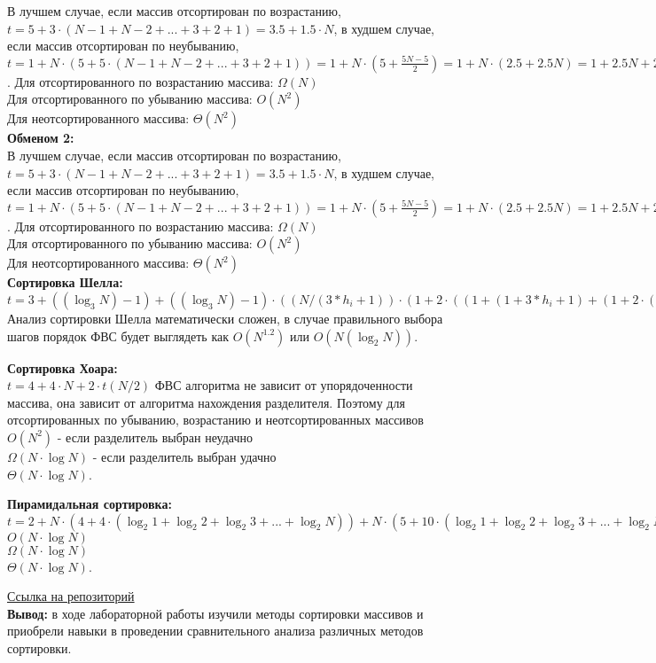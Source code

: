 \documentclass[a4paper,14pt]{extarticle}
\begin{document}
\begin{enumerate}
	      В лучшем случае, если массив отсортирован по возрастанию, $t = 5 + 3 \cdot (N - 1 + N - 2 + ... + 3 + 2 + 1) = 3.5 + 1.5\cdot N$, 
		  в худшем случае, если массив отсортирован по неубыванию, 
		  $t = 1 + N\cdot (5 + 5 \cdot (N - 1 + N - 2 + ... + 3 + 2 + 1)) = 1 + N\cdot(5 + \frac{5N - 5}{2}) = 1 + N \cdot (2.5 + 2.5N) = 1 + 2.5N + 2.5N^2$.\bigbreak
		  Для отсортированного по возрастанию массива: $\Omega(N)$\\
		  Для отсортированного по убыванию массива: $O(N^2)$\\
		  Для неотсортированного массива: $\Theta(N^2)$\\
	      \textbf{Обменом 2:}\\
	      В лучшем случае, если массив отсортирован по возрастанию, $t = 5 + 3\cdot(N - 1 + N - 2 + ... + 3 + 2 + 1) = 3.5 + 1.5\cdot N$, 
		  в худшем случае, если массив отсортирован по неубыванию, 
		  $t = 1 + N\cdot (5 + 5 \cdot (N - 1 + N - 2 + ... + 3 + 2 + 1)) = 1 + N\cdot(5 + \frac{5N - 5}{2}) = 1 + N \cdot (2.5 + 2.5N) = 1 + 2.5N + 2.5N^2$.\bigbreak
		  Для отсортированного по возрастанию массива: $\Omega(N)$\\
		  Для отсортированного по убыванию массива: $O(N^2)$\\
		  Для неотсортированного массива: $\Theta(N^2)$\\
	      \textbf{Сортировка Шелла:}\\
		  $t = 3 + ((\log_{3}N) - 1) + ((\log_{3}N) - 1) \cdot ((N / (3 * h_i + 1)) \cdot (1 + 2 \cdot ((1 + (1 + 3 * h_i + 1) + (1 + 2\cdot(3 * h_i + 1)) + (1 + 3\cdot(3 * h_i + 1)) + ... + (1 + N / (3 * h_i + 1))))) + 1)$\bigbreak
		  Анализ сортировки Шелла математически сложен, в случае правильного выбора шагов порядок ФВС будет выглядеть как $O(N^{1.2})$ или $O(N(\log_2N))$.
		  
	      \textbf{Сортировка Хоара:}\\
		  $t = 4 + 4\cdot N + 2\cdot t(N / 2)$\bigbreak
		  ФВС алгоритма не зависит от упорядоченности массива, она зависит от алгоритма нахождения разделителя. 
		  Поэтому для отсортированных по убыванию, возрастанию и неотсортированных массивов \\
		  $O(N^2)$ - если разделитель выбран неудачно\\
		  $\Omega(N \cdot \log N)$ - если разделитель выбран удачно\\
		  $\Theta(N \cdot \log N)$.
		  
	      \textbf{Пирамидальная сортировка:}\\
		  $t = 2 + N\cdot (4 + 4 \cdot (\log_2 1 + \log_2 2 + \log_2 3 + ... + \log_2 N)) + N \cdot (5 + 10 \cdot (\log_2 1 + \log_2 2 + \log_2 3 + ... + \log_2 N))$\bigbreak
		  $O(N \cdot \log N)$\\
		  $\Omega(N \cdot \log N)$\\
		  $\Theta(N \cdot \log N)$.
		\end{enumerate}
\href{https://github.com/IAmProgrammist/algorithms_and_data_structures/tree/main}{Ссылка на репозиторий}\\
\textbf{Вывод: } в ходе лабораторной работы изучили методы сортировки массивов и приобрели
навыки в проведении сравнительного анализа различных методов сортировки.
\end{document}
